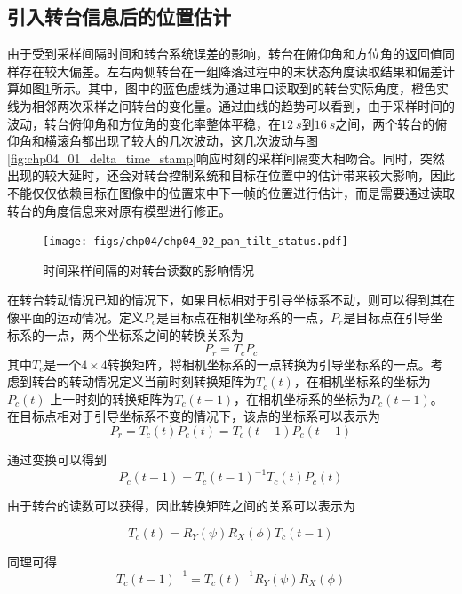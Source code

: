 \subsection{引入转台信息后的位置估计}
由于受到采样间隔时间和转台系统误差的影响，转台在俯仰角和方位角的返回值同样存在较大偏差。左右两侧转台在一组降落过程中的末状态角度读取结果和偏差计算如图\ref{fig:chp04_02_pan_tilt_status}所示。其中，图中的蓝色虚线为通过串口读取到的转台实际角度，橙色实线为相邻两次采样之间转台的变化量。通过曲线的趋势可以看到，由于采样时间的波动，转台俯仰角和方位角的变化率整体平稳，在$12\ s$到$16\ s$之间，两个转台的俯仰角和横滚角都出现了较大的几次波动，这几次波动与图\ref{fig:chp04_01_delta_time_stamp}响应时刻的采样间隔变大相吻合。同时，突然出现的较大延时，还会对转台控制系统和目标在位置中的估计带来较大影响，因此不能仅仅依赖目标在图像中的位置来中下一帧的位置进行估计，而是需要通过读取转台的角度信息来对原有模型进行修正。
\begin{figure}[htb]   
	\centering
	\texttt{[image: figs/chp04/chp04\_02\_pan\_tilt\_status.pdf]}
	\caption{时间采样间隔的对转台读数的影响情况}
	\label{fig:chp04_02_pan_tilt_status}
\end{figure}

在转台转动情况已知的情况下，如果目标相对于引导坐标系不动，则可以得到其在像平面的运动情况。定义$P_c$是目标点在相机坐标系的一点，$P_r$是目标点在引导坐标系的一点，两个坐标系之间的转换关系为
\begin{equation}
P_r = T_c P_c
\end{equation}
其中$T_c$是一个$4 \times 4$转换矩阵，将相机坐标系的一点转换为引导坐标系的一点。考虑到转台的转动情况定义当前时刻转换矩阵为$T_c(t)$，在相机坐标系的坐标为$P_c(t)$ 上一时刻的转换矩阵为$T_c(t-1)$，在相机坐标系的坐标为$P_c(t-1)$。在目标点相对于引导坐标系不变的情况下，该点的坐标系可以表示为
\begin{equation}
P_r = T_c(t) P_c(t) =T_c(t-1) P_c(t-1)
\end{equation}

通过变换可以得到
\begin{equation}
\label{eq:chp04_predict_position}
P_c(t-1) = T_c(t-1)^{-1}T_c(t) P_c(t)
\end{equation}

由于转台的读数可以获得，因此转换矩阵之间的关系可以表示为

\begin{equation}
T_c(t) = R_Y(\psi)R_X(\phi)T_c(t-1)
\end{equation}

同理可得
\begin{equation}
T_c(t-1)^{-1} = T_c(t)^{-1}R_Y(\psi)R_X(\phi)
\end{equation}

